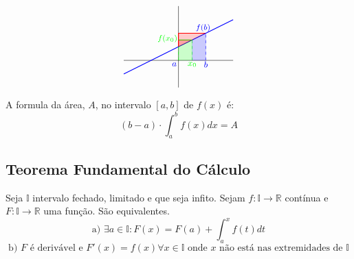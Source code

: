 \documentclass{article}
\begin{document}
    \begin{equation*}
        \begin{tikzpicture}
            \draw (-2, 0) -- (2, 0); 
            \draw (0, -1) -- (0, 2); 

            \draw[red, thick](0, 0.5) -- (0, 1);
            \draw[red, thick](0, 1) -- (1, 1);

            \draw[blue, dashed](1, 0) -- (1, 1);
            \draw[blue, thick](-2, -0.5) -- (-1, 0) -- (0, 0.5) --
            (1, 1) -- (2, 1.5);

            \draw[green, dashed](0, 0) -- (0, 0.5);
            \draw[green, dashed] (0.5, 0) -- (0.5, 0.75);
            \draw[green, thick] (0, 0.75) -- (0.5, 0.75);

            \draw[red, fill, opacity = 0.2](0, 0.5) -- (0, 1) --
            (1, 1) -- (0, 0.5);
            \draw[red, fill, opacity = 0.2] (0.5, 0.74) -- (0, 0.74)
            -- (0, 0.5);

            \draw[blue, fill, opacity = 0.2](0.5, 0) -- (1, 0) --
            (1, 1) -- (0.5, 0.75) -- (0.5, 0);

            \draw[green, fill, opacity = 0.2](0, 0) -- (0.5, 0) --
            (0.5, 0.75) -- (0, 0.5) -- (0, 0);

            \node[blue] at (-0.15, -0.15) {\small $a$};
            \node[blue] at (1, -0.15) {\small $b$};
            \node[blue] at (0.9, 1.2) {\footnotesize $f(b)$};

            \node[green] at (0.5, -0.15) {\small $x_0$};
            \node[green] at (-0.4, 0.8) {\footnotesize $f(x_0)$};
        \end{tikzpicture}
    \end{equation*}

    A formula da área, $A$, no intervalo $[a, b]$ de $f(x)$ é:
    \begin{equation*}
        (b - a) \cdot\int_{a}^{b} f(x)dx = A 
    \end{equation*}

    \subsection{Teorema Fundamental do Cálculo}
    Seja $\mathbb{I}$ intervalo fechado, limitado e que seja infito.
    Sejam $f: \mathbb{I}\rightarrow\mathbb{R}$ contínua e $F:
    \mathbb{I}\rightarrow\mathbb{R}$ uma função. São equivalentes.
    \begin{equation*}
        \text{a) } \exists a\in\mathbb{I}:F(x) = F(a) +
        \int_{a}^{x}f(t)dt
    \end{equation*}
    \begin{equation*}
        \text{b) } F \text{ é derivável e } F'(x) = f(x) \forall x
        \in\mathbb{I} \text{ onde $x$ não está nas extremidades de }
        \mathbb{I}
    \end{equation*}
\end{document}
